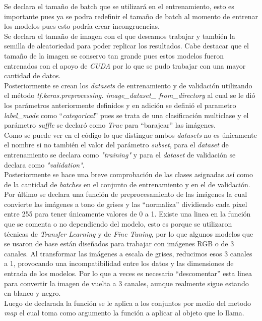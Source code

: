 Se declara el tamaño de batch que se utilizará en el entrenamiento, esto es importante pues ya se podra redefinir el tamaño de batch al momento de entrenar los modelos pues esto podría crear incongruencias. \\
Se declara el tamaño de imagen con el que deseamos trabajar y también la semilla de aleatoriedad para poder replicar los resultados. Cabe destacar que el tamaño de la imagen se conservo tan grande pues estos modelos fueron entrenados con el apoyo de \textit{CUDA} por lo que se pudo trabajar con una mayor cantidad de datos. \\
Posteriormente se crean los \textit{datasets} de entrenamiento y de validación utilizando el método \textit{tf.keras.preprocessing.
image\_dataset\_ from\_directory} al cual se le dió los parámetros anteriormente definidos y en adición se definió el parametro\textit{ label\_mode} como ``\textit{categorical}'' pues se trata de una clasificación multiclase y el parámetro \textit{suffle} se declaró como \textit{True} para ``barajear'' las imágenes.\\
Como se puede ver en el código lo que distingue ambos \textit{datasets} no es únicamente el nombre si no también el valor del parámetro \textit{subset}, para el \textit{dataset} de entrenamiento se declara como  \textit{"training"} y para el \textit{dataset} de validación se declara como \textit{"validation"}.\\
Posteriormente se hace una breve comprobación de las clases asignadas así como de la cantidad de \textit{batches} en el conjunto de entrenamiento y en el de validación. \\
Por último se declara una función de preprocesamiento de las imágenes la cual convierte las imágenes a tono de grises y las ``normaliza'' dividiendo cada pixel entre 255 para tener únicamente valores de 0 a 1. Existe una linea en la función que se comenta o no dependiendo del modelo, esto es porque se utilizaron técnicas de \textit{Transfer Learning} y de \textit{Fine Tuning}, por lo que algunos modelos que se usaron de base están diseñados para trabajar con imágenes RGB o de 3 canales. Al transformar las imágenes a escala de grises, reducimos esos 3 canales a 1, provocando una incompatibilidad entre los datos y las dimensiones de entrada de los modelos. Por lo que a veces es necesario ``descomentar'' esta linea para convertir la imagen de vuelta a 3 canales, aunque realmente sigue estando en blanco y negro. \\
Luego de declarada la función se le aplica a los conjuntos por medio del metodo \textit{map} el cual toma como argumento la función a aplicar al objeto que lo llama.

